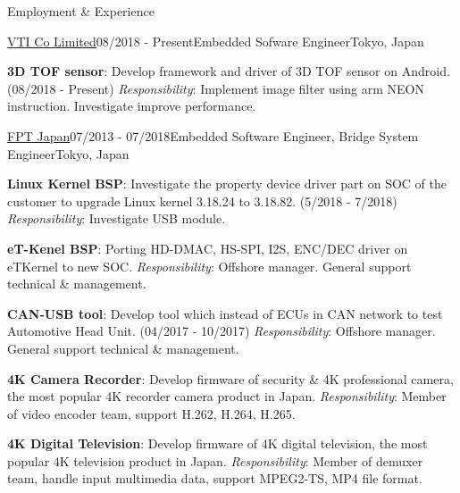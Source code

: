 \documentclass{resume}
\begin{document}
  \begin{rSection}{Employment \& Experience}
  
    \begin{rSubsection}{\href{https://www.vti.com.vn/company-vti-japan/}{\underline{VTI Co Limited}}}{08/2018 - Present}{Embedded Sofware Engineer}{Tokyo, Japan}
    \item \textbf{3D TOF sensor}: Develop framework and driver of 3D TOF sensor on Android. (08/2018 - Present)
    \newline \textit{Responsibility}: Implement image filter using arm NEON instruction. Investigate improve performance.
    \end{rSubsection}
  
    \begin{rSubsection}{\href{https://www.fpt-software.jp/company-information/fpt-japan/}{\underline{FPT Japan}}}{07/2013 - 07/2018}{Embedded Software Engineer, Bridge System Engineer}{Tokyo, Japan}
    \item \textbf{Linux Kernel BSP}: Investigate the property device driver part on SOC of the customer to upgrade Linux kernel 3.18.24 to 3.18.82. (5/2018 - 7/2018)
    \newline \textit{Responsibility}: Investigate USB module.

    \item \textbf{eT-Kenel BSP}: Porting HD-DMAC, HS-SPI, I2S, ENC/DEC driver on eTKernel to new SOC.
    \newline \textit{Responsibility}: Offshore manager. General support technical \& management.

    \item \textbf{CAN-USB tool}: Develop tool which instead of ECUs in CAN network to test Automotive Head Unit. (04/2017 - 10/2017) 
    \newline \textit{Responsibility}: Offshore manager. General support technical \& management.

    \item \textbf{4K Camera Recorder}: Develop firmware of security \& 4K professional camera, the most popular 4K recorder camera product in Japan.
    \newline \textit{Responsibility}: Member of video encoder team, support H.262, H.264, H.265.

    \item \textbf{4K Digital Television}: Develop firmware of 4K digital television, the most popular 4K television product in Japan.
    \newline \textit{Responsibility}: Member of demuxer team, handle input multimedia data, support MPEG2-TS, MP4 file format.


\end{rSubsection}
\end{rSection}
\end{document}
